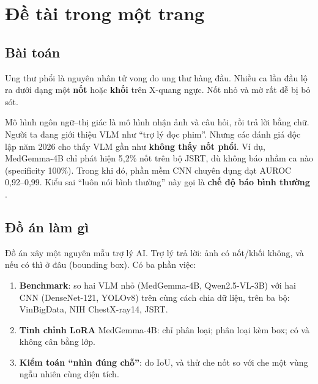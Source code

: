 \section{Đề tài trong một trang}
\label{sec:topic}

\subsection{Bài toán}

Ung thư phổi là nguyên nhân tử vong do ung thư hàng đầu. Nhiều ca lần đầu lộ ra dưới dạng một
\textbf{nốt} hoặc \textbf{khối} trên X-quang ngực. Nốt nhỏ và mờ rất dễ bị bỏ sót.

Mô hình ngôn ngữ--thị giác  là mô hình nhận ảnh và câu hỏi, rồi trả lời bằng chữ.
Người ta đang giới thiệu VLM như ``trợ lý đọc phim''. Nhưng các đánh giá độc lập năm 2026 cho thấy VLM gần như
\textbf{không thấy nốt phổi}. Ví dụ, MedGemma-4B chỉ phát hiện 5,2\% nốt trên bộ JSRT, dù không báo nhầm ca nào
(specificity 100\%). Trong khi đó, phần mềm CNN chuyên dụng đạt AUROC 0,92--0,99. Kiểu sai ``luôn nói bình thường''
này gọi là \textbf{chế độ báo bình thường} .

\subsection{Đồ án làm gì}

Đồ án xây một nguyên mẫu trợ lý AI. Trợ lý trả lời: ảnh có nốt/khối không, và nếu có thì ở đâu (bounding box).
Có ba phần việc:

\begin{enumerate}
\item \textbf{Benchmark}: so hai VLM nhỏ (MedGemma-4B, Qwen2.5-VL-3B) với hai CNN (DenseNet-121, YOLOv8) trên cùng cách chia dữ liệu,
      trên ba bộ: VinBigData, NIH ChestX-ray14, JSRT.
\item \textbf{Tinh chỉnh LoRA} MedGemma-4B: chỉ phân loại; phân loại kèm box; có và không cân bằng lớp.
\item \textbf{Kiểm toán ``nhìn đúng chỗ''}: đo IoU, và thử che nốt so với che một vùng ngẫu nhiên cùng diện tích.
\end{enumerate}


